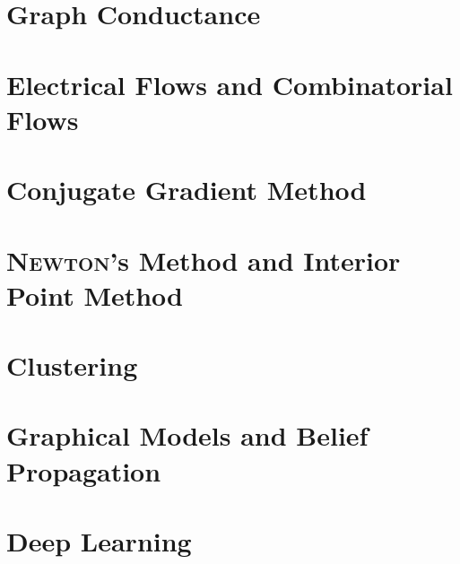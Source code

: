 \chapter{Graph Conductance}
    
    
\chapter{Electrical Flows and Combinatorial Flows}
    

\chapter{Conjugate Gradient Method}
\chapter{\textsc{Newton}'s Method and Interior Point Method}
\chapter{Clustering}
\chapter{Graphical Models and Belief Propagation}
\chapter{Deep Learning}
    



\nocite{*}








